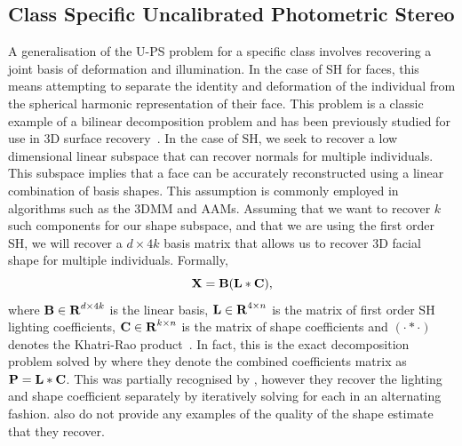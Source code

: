 \subsection{Class Specific Uncalibrated Photometric Stereo}\label{subsec:imag_coll_class_uncalibrated_ps}
A generalisation of the U-PS problem for a specific class involves
recovering a joint basis of deformation and illumination. In the case of SH for
faces, this means attempting to separate the identity and deformation of the
individual from the spherical harmonic representation of their face.
This problem is a classic example of a bilinear
decomposition problem and has been previously studied for use in 3D surface
recovery~\cite{zhou2007appearance,minsik2014realtime,minsik2011fast,%
lee2005bilinear,KemelmacherShlizerman:2013iv}. In
the case of SH, we seek to recover a low dimensional linear subspace that can
recover normals for multiple individuals. This subspace implies that a face can
be accurately reconstructed using a linear combination of basis shapes. This
assumption is commonly employed in algorithms such as the 3DMM and AAMs.
Assuming that we want to recover $k$ such components for our shape subspace, and
that we are using the first order SH, we will recover a $d \times 4k$ basis
matrix that allows us to recover 3D facial shape for multiple individuals.
Formally,
\begin{equation}\label{eq:class_specific_ps}
        \boldsymbol{\mathbf{X}} = \boldsymbol{\mathbf{B}} (\boldsymbol{\mathbf{L}} \ast \boldsymbol{\mathbf{C}}),
\end{equation}
where $\boldsymbol{\mathbf{B}} \in \boldsymbol{\mathbf{R}}^{d \times 4k}$ is the linear basis,
$\boldsymbol{\mathbf{L}} \in \boldsymbol{\mathbf{R}}^{4 \times n}$ is the matrix of first order SH lighting
coefficients, $\boldsymbol{\mathbf{C}} \in \boldsymbol{\mathbf{R}}^{k \times n}$ is the matrix of shape
coefficients and $(\cdot \ast \cdot)$ denotes the Khatri-Rao
product~\cite{khatri1968solutions}. In fact, this is the exact decomposition problem
solved by \citet{KemelmacherShlizerman:2013iv} where they denote the combined
coefficients matrix as $\boldsymbol{\mathbf{P}} = \boldsymbol{\mathbf{L}} \ast \boldsymbol{\mathbf{C}}$. This was partially
recognised by \citet{zhou2007appearance}, however they recover the lighting and
shape coefficient separately by iteratively solving for each in an alternating
fashion. \citet{zhou2007appearance} also do not provide any examples of the
quality of the shape estimate that they recover.

